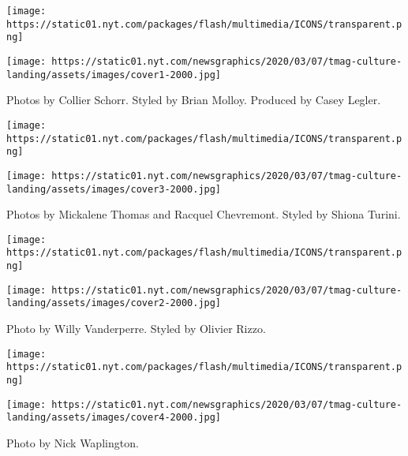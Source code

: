 \href{https://www.nytimes.com/interactive/2020/04/13/t-magazine/butch-stud-lesbian.html}{}

\texttt{[image: https://static01.nyt.com/packages/flash/multimedia/ICONS/transparent.png]}

\texttt{[image: https://static01.nyt.com/newsgraphics/2020/03/07/tmag-culture-landing/assets/images/cover1-2000.jpg]}

Photos by Collier Schorr. Styled by Brian Molloy. Produced by Casey
Legler.

\href{https://www.nytimes.com/interactive/2020/04/13/t-magazine/black-actresses-bassett-berry-blige-henson-whitfield-elise.html}{}

\texttt{[image: https://static01.nyt.com/packages/flash/multimedia/ICONS/transparent.png]}

\texttt{[image: https://static01.nyt.com/newsgraphics/2020/03/07/tmag-culture-landing/assets/images/cover3-2000.jpg]}

Photos by Mickalene Thomas and Racquel Chevremont. Styled by Shiona
Turini.

\href{https://www.nytimes.com/interactive/2020/04/13/t-magazine/dominican-republic-models.html}{}

\texttt{[image: https://static01.nyt.com/packages/flash/multimedia/ICONS/transparent.png]}

\texttt{[image: https://static01.nyt.com/newsgraphics/2020/03/07/tmag-culture-landing/assets/images/cover2-2000.jpg]}

Photo by Willy Vanderperre. Styled by Olivier Rizzo.

\href{https://www.nytimes.com/interactive/2020/04/13/t-magazine/maria-cornejo-olivier-rousteing-telfar-clemens-alessandro-michele.html\#alessandro-michele-and-co}{}

\texttt{[image: https://static01.nyt.com/packages/flash/multimedia/ICONS/transparent.png]}

\texttt{[image: https://static01.nyt.com/newsgraphics/2020/03/07/tmag-culture-landing/assets/images/cover4-2000.jpg]}

Photo by Nick Waplington.

